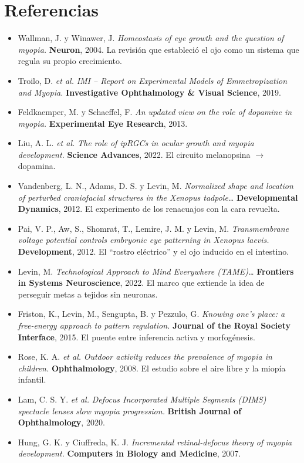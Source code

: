 \documentclass[10pt,a4paper]{article}
\providecommand{\enquote}[1]{``#1''}
\begin{document}
\section*{Referencias}
\small
\begin{itemize}[leftmargin=1.3em,itemsep=3pt]
  \item Wallman, J. y Winawer, J. \emph{Homeostasis of eye growth and the question of myopia.} \textbf{Neuron}, 2004. La revisi\'on que estableci\'o el ojo como un sistema que regula su propio crecimiento.
  \item Troilo, D. \emph{et al.} \emph{IMI -- Report on Experimental Models of Emmetropization and Myopia.} \textbf{Investigative Ophthalmology \& Visual Science}, 2019.
  \item Feldkaemper, M. y Schaeffel, F. \emph{An updated view on the role of dopamine in myopia.} \textbf{Experimental Eye Research}, 2013.
  \item Liu, A. L. \emph{et al.} \emph{The role of ipRGCs in ocular growth and myopia development.} \textbf{Science Advances}, 2022. El circuito melanopsina \(\rightarrow\) dopamina.
  \item Vandenberg, L. N., Adams, D. S. y Levin, M. \emph{Normalized shape and location of perturbed craniofacial structures in the Xenopus tadpole\ldots} \textbf{Developmental Dynamics}, 2012. El experimento de los renacuajos con la cara revuelta.
  \item Pai, V. P., Aw, S., Shomrat, T., Lemire, J. M. y Levin, M. \emph{Transmembrane voltage potential controls embryonic eye patterning in Xenopus laevis.} \textbf{Development}, 2012. El \enquote{rostro el\'ectrico} y el ojo inducido en el intestino.
  \item Levin, M. \emph{Technological Approach to Mind Everywhere (TAME)\ldots} \textbf{Frontiers in Systems Neuroscience}, 2022. El marco que extiende la idea de perseguir metas a tejidos sin neuronas.
  \item Friston, K., Levin, M., Sengupta, B. y Pezzulo, G. \emph{Knowing one's place: a free-energy approach to pattern regulation.} \textbf{Journal of the Royal Society Interface}, 2015. El puente entre inferencia activa y morfog\'enesis.
  \item Rose, K. A. \emph{et al.} \emph{Outdoor activity reduces the prevalence of myopia in children.} \textbf{Ophthalmology}, 2008. El estudio sobre el aire libre y la miop\'ia infantil.
  \item Lam, C. S. Y. \emph{et al.} \emph{Defocus Incorporated Multiple Segments (DIMS) spectacle lenses slow myopia progression.} \textbf{British Journal of Ophthalmology}, 2020.
  \item Hung, G. K. y Ciuffreda, K. J. \emph{Incremental retinal-defocus theory of myopia development.} \textbf{Computers in Biology and Medicine}, 2007.
\end{itemize}
\normalsize

\vspace{0.6em}
\end{document}
